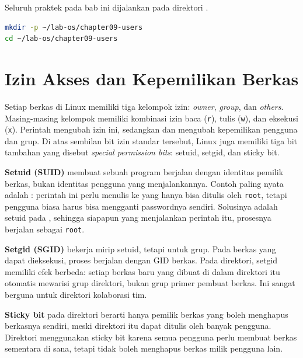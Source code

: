 \begin{notebox}
Seluruh praktek pada bab ini dijalankan pada direktori .
\begin{lstlisting}[language=bash]
mkdir -p ~/lab-os/chapter09-users
cd ~/lab-os/chapter09-users
\end{lstlisting}
\end{notebox}

\section{Izin Akses dan Kepemilikan Berkas}
\label{sec:advanced-permissions}

Setiap berkas di Linux memiliki tiga kelompok izin: \textit{owner}, \textit{group}, dan \textit{others}. Masing-masing kelompok memiliki kombinasi izin baca (\texttt{r}), tulis (\texttt{w}), dan eksekusi (\texttt{x}). Perintah  mengubah izin ini, sedangkan  dan  mengubah kepemilikan pengguna dan grup. Di atas sembilan bit izin standar tersebut, Linux juga memiliki tiga bit tambahan yang disebut \textit{special permission bits}: setuid, setgid, dan sticky bit.

\textbf{Setuid (SUID)} membuat sebuah program berjalan dengan identitas pemilik berkas, bukan identitas pengguna yang menjalankannya. Contoh paling nyata adalah : perintah ini perlu menulis ke  yang hanya bisa ditulis oleh \texttt{root}, tetapi pengguna biasa harus bisa mengganti passwordnya sendiri. Solusinya adalah setuid pada , sehingga siapapun yang menjalankan perintah itu, prosesnya berjalan sebagai \texttt{root}.

\textbf{Setgid (SGID)} bekerja mirip setuid, tetapi untuk grup. Pada berkas yang dapat dieksekusi, proses berjalan dengan GID berkas. Pada direktori, setgid memiliki efek berbeda: setiap berkas baru yang dibuat di dalam direktori itu otomatis mewarisi grup direktori, bukan grup primer pembuat berkas. Ini sangat berguna untuk direktori kolaborasi tim.

\textbf{Sticky bit} pada direktori berarti hanya pemilik berkas yang boleh menghapus berkasnya sendiri, meski direktori itu dapat ditulis oleh banyak pengguna. Direktori  menggunakan sticky bit karena semua pengguna perlu membuat berkas sementara di sana, tetapi tidak boleh menghapus berkas milik pengguna lain.

